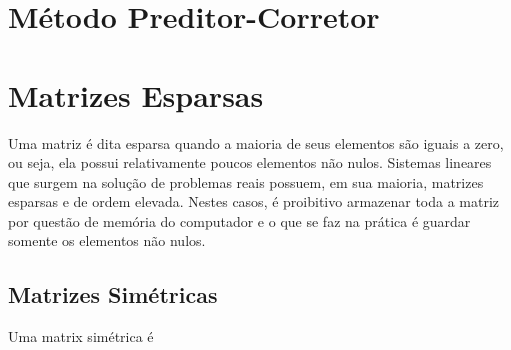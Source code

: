 % 
% 
% 
% 
% 
%
\section{Método Preditor-Corretor}

\section{Matrizes Esparsas}
Uma matriz é dita esparsa quando a maioria de seus elementos são iguais a zero, ou seja, ela possui relativamente poucos elementos não nulos. Sistemas lineares que surgem na solução de problemas reais possuem, em sua maioria, matrizes esparsas e de ordem elevada. Nestes casos, é proibitivo armazenar toda a matriz por questão de memória do computador e o que se faz na prática é guardar somente os elementos não nulos.

\subsection{Matrizes Simétricas}
Uma matrix simétrica é

